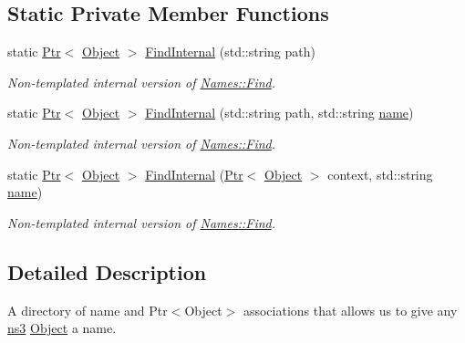 \subsection*{Static Private Member Functions}
\begin{DoxyCompactItemize}
\item 
static \hyperlink{classns3_1_1Ptr}{Ptr}$<$ \hyperlink{classns3_1_1Object}{Object} $>$ \hyperlink{classns3_1_1Names_a1d022d5483c79de459ce17e89d98d3f4}{Find\+Internal} (std\+::string path)
\begin{DoxyCompactList}\small\item\em Non-\/templated internal version of \hyperlink{classns3_1_1Names_a9d07094fb3d716d08733af05c1593555}{Names\+::\+Find}. \end{DoxyCompactList}\item 
static \hyperlink{classns3_1_1Ptr}{Ptr}$<$ \hyperlink{classns3_1_1Object}{Object} $>$ \hyperlink{classns3_1_1Names_a429d750ca5b03823d6dea2ed3476b3ab}{Find\+Internal} (std\+::string path, std\+::string \hyperlink{generate__test__data__lte__spectrum__model_8m_ab74e6bf80237ddc4109968cedc58c151}{name})
\begin{DoxyCompactList}\small\item\em Non-\/templated internal version of \hyperlink{classns3_1_1Names_a9d07094fb3d716d08733af05c1593555}{Names\+::\+Find}. \end{DoxyCompactList}\item 
static \hyperlink{classns3_1_1Ptr}{Ptr}$<$ \hyperlink{classns3_1_1Object}{Object} $>$ \hyperlink{classns3_1_1Names_ad261506a54c7a4f7db29a856d8a9d6d2}{Find\+Internal} (\hyperlink{classns3_1_1Ptr}{Ptr}$<$ \hyperlink{classns3_1_1Object}{Object} $>$ context, std\+::string \hyperlink{generate__test__data__lte__spectrum__model_8m_ab74e6bf80237ddc4109968cedc58c151}{name})
\begin{DoxyCompactList}\small\item\em Non-\/templated internal version of \hyperlink{classns3_1_1Names_a9d07094fb3d716d08733af05c1593555}{Names\+::\+Find}. \end{DoxyCompactList}\end{DoxyCompactItemize}


\subsection{Detailed Description}
A directory of name and Ptr$<$\+Object$>$ associations that allows us to give any \hyperlink{namespacens3}{ns3} \hyperlink{classns3_1_1Object}{Object} a name. 

